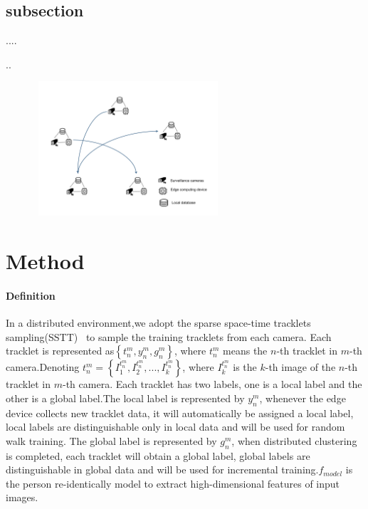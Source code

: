 \documentclass{article}
\begin{document}
\subsection{subsection}
....

..


\begin{figure}[htb]
    \centerline{ \includegraphics[width=7cm,height=5cm]{fig_1.pdf}}
    \caption{}
    \label{}
\end{figure}

\section{Method}
\paragraph{Definition} 
In a distributed environment,we adopt the sparse space-time tracklets sampling(SSTT)~\cite{li2018unsupervised} to sample the training tracklets from each camera. Each tracklet is represented as$\left \{t_{n}^{m}, y_{n}^{m}, g_{n}^{m}\right \}$, where $t_{n}^{m}$ means the $n$-th tracklet in $m$-th camera.Denoting $t_{n}^{m}=\left \{  I_{1}^{t_{n}^{m}},  I_{2}^{t_{n}^{m}},...,I_{k}^{t_{n}^{m}} \right \}$, where $I_{k}^{t_{n}^{m}}$ is the $k$-th image of the $n$-th tracklet in $m$-th camera. Each tracklet has two labels, one is a local label and the other is a global label.The local label is represented by $y_{n}^{m}$, whenever the edge device collects new tracklet data, it will automatically be assigned a local label, local labels are distinguishable only in local data and will be used for random walk training. The global label is represented by $g_{n}^{m}$, when distributed clustering is completed, each tracklet will obtain a global label, global labels are distinguishable in global data and will be used for incremental training.$f_{model}$ is the person re-identically model to extract high-dimensional features of input images.
\end{document}
